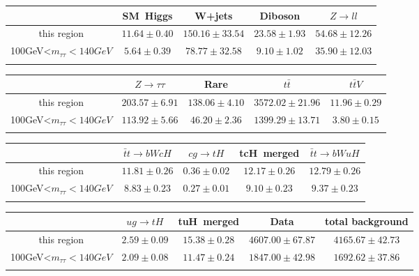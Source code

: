 \centering
\begin{tabular}{ccccc} \toprule\toprule
 & SM~Higgs & W+jets & Diboson & $Z\to ll$\\\midrule
this region & $11.64\pm0.40$ & $150.16\pm33.54$ & $23.58\pm1.93$ & $54.68\pm12.26$\\
100GeV<$m_{\tau\tau}<140GeV$ & $5.64\pm0.39$ & $78.77\pm32.58$ & $9.10\pm1.02$ & $35.90\pm12.03$\\
\bottomrule\bottomrule\\
\end{tabular}
\begin{tabular}{ccccc} \toprule\toprule
 & $Z\to \tau\tau$ & Rare & $t\bar{t}$ & $t\bar{t}V$\\\midrule
this region & $203.57\pm6.91$ & $138.06\pm4.10$ & $3572.02\pm21.96$ & $11.96\pm0.29$\\
100GeV<$m_{\tau\tau}<140GeV$ & $113.92\pm5.66$ & $46.20\pm2.36$ & $1399.29\pm13.71$ & $3.80\pm0.15$\\
\bottomrule\bottomrule\\
\end{tabular}
\begin{tabular}{ccccc} \toprule\toprule
 & $\bar{t}t\to bWcH$ & $cg\to tH$ & tcH~merged & $\bar{t}t\to bWuH$\\\midrule
this region & $11.81\pm0.26$ & $0.36\pm0.02$ & $12.17\pm0.26$ & $12.79\pm0.26$\\
100GeV<$m_{\tau\tau}<140GeV$ & $8.83\pm0.23$ & $0.27\pm0.01$ & $9.10\pm0.23$ & $9.37\pm0.23$\\
\bottomrule\bottomrule\\
\end{tabular}
\begin{tabular}{ccccc} \toprule\toprule
 & $ug\to tH$ & tuH~merged & Data & total background\\\midrule
this region & $2.59\pm0.09$ & $15.38\pm0.28$ & $4607.00\pm67.87$ & $4165.67\pm42.73$\\
100GeV<$m_{\tau\tau}<140GeV$ & $2.09\pm0.08$ & $11.47\pm0.24$ & $1847.00\pm42.98$ & $1692.62\pm37.86$\\
\bottomrule\bottomrule\\
\end{tabular}
